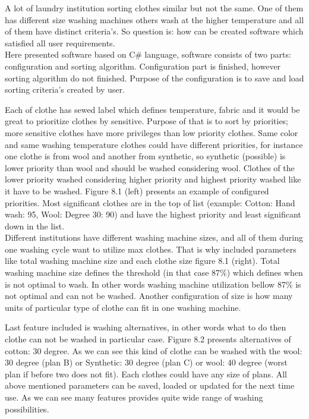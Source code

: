 A lot of laundry institution sorting clothes similar but not the same. One of them has different size washing machines others wash at the higher temperature and all of them have distinct criteria’s.   So question is: how can be created software which satisfied all user requirements. \\  Here presented software based on C\# language, software consists of two parts: configuration and sorting algorithm. Configuration part is finished, however sorting algorithm do not finished. Purpose of the configuration is to save and load sorting criteria’s created by user. 

Each of clothe has sewed label which defines temperature, fabric and it would be great to prioritize clothes by sensitive. Purpose of that is to sort by priorities; more sensitive clothes have more privileges than low priority clothes. Same color and same washing temperature clothes could have different priorities, for instance one clothe is from wool and another from synthetic, so synthetic (possible) is lower priority than wool and should be washed considering wool. Clothes of the lower priority washed considering higher priority and highest priority washed like it have to be washed. Figure 8.1 (left) presents an example of configured priorities. Most significant clothes are in the top of list (example: Cotton: Hand wash: 95, Wool: Degree 30: 90) and have the highest priority and least significant down in the list. \\ Different institutions have different washing machine sizes, and all of them during one washing cycle want to utilize max clothes. That is why included parameters like total washing machine size and each clothe size figure 8.1 (right). Total washing machine size defines the threshold (in that case 87\%) which defines when is not optimal to wash. In other words washing machine utilization bellow 87\% is not optimal and can not be washed. Another configuration of size is how many units of particular type of clothe can fit in one washing machine. 


Last feature included is washing alternatives, in other words what to do then clothe can not be washed in particular case. Figure 8.2 presents alternatives of cotton: 30 degree. As we can see this kind of clothe can be washed with the wool: 30 degree (plan B) or Synthetic: 30 degree (plan C) or wool: 40 degree (worst plan if before two does not fit). Each clothes could have any size of plans. All above mentioned parameters can be saved, loaded or updated for the next time use. As we can see many features provides quite wide range of washing possibilities.

